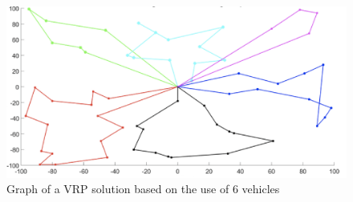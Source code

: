 \newline\newline


\begin{figure}[h]
    \centering
    \includegraphics[width=1.0\textwidth]{images/vrp-graph.png}
    \caption{Graph of a VRP solution based on the use of 6 vehicles}
    \label{fig:mesh1}
\end{figure}
